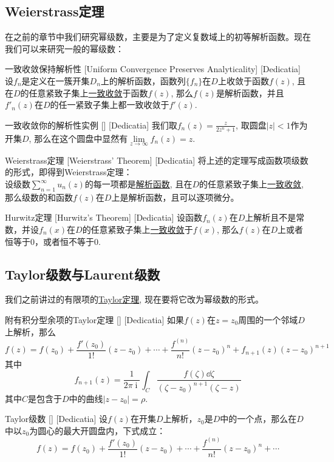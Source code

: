 \documentclass[UTF8]{ctexart}
\DeclareMathOperator{\ii}{\mathrm{i}}
\newcommand{\AnalyticalFunction}{\hyperref[dfn:AnalyticalFunction]{解析函数}}
\newcommand{\UniformConvergence}{\hyperref[dfn:UniformConvergence]{一致收敛}}
\newcommand{\TaylorThm}{\hyperref[thm:Taylor]{Taylor定理}}
\begin{document}
\subsection{Weierstrass定理}
在之前的章节中我们研究幂级数，主要是为了定义复数域上的初等解析函数。现在我们可以来研究一般的幂级数：
\begin{thm}
    [UUID]
    {一致收敛保持解析性}
    [Uniform Convergence Preserves Analyticality]
    [Dedicatia]
    设$f_n$是定义在一簇开集$D_n$上的解析函数，函数列$\{f_n\}$在$D$上收敛于函数$f(z)$, 且在$D$的任意紧致子集上\UniformConvergence 于函数$f(z)$, 那么$f(z)$是解析函数，并且$f'_n(z)$在$D$的任一紧致子集上都一致收敛于$f'(z)$.
\end{thm}
\begin{xmp}
    [UUID]
    {一致收敛你的解析性实例}
    []
    [Dedicatia]
    我们取$f_n(z)=\frac{z}{2z^n+1}$, 取圆盘$|z|<1$作为开集$D$, 那么在这个圆盘中显然有$\lim\limits_{z\to\infty}f_n(z)=z$.
\end{xmp}
\begin{thm}
    [UUID]
    {Weierstrass定理}
    [Weierstrass' Theorem]
    [Dedicatia]
    将上述的定理写成函数项级数的形式，即得到Weierstrass定理：\\
    设级数$\sum_{n = 1}^{\infty} u_n(z)$的每一项都是\AnalyticalFunction , 且在$D$的任意紧致子集上\UniformConvergence , 那么级数的和函数$f(z)$在$D$上是解析函数，且可以逐项微分。
\end{thm}
\begin{thm}
    [UUID]
    {Hurwitz定理}
    [Hurwitz's Theorem]
    [Dedicatia]
    设函数$f_n(z)$在$D$上解析且不是常数，并设$f_n(x)$在$D$的任意紧致子集上\UniformConvergence 于$f(x)$, 那么$f(z)$在$D$上或者恒等于0，或者恒不等于0.
\end{thm}
\subsection{Taylor级数与Laurent级数}
我们之前讲过的有限项的\TaylorThm , 现在要将它改为幂级数的形式。
\begin{thm}
    [UUID]
    {附有积分型余项的Taylor定理}
    []
    [Dedicatia]
    如果$f(z)$在$z=z_0$周围的一个邻域$D$上解析，那么
    \[f(z)=f(z_0)+\frac{f'(z_0)}{1!}(z-z_0)+\cdots+\frac{f^{(n)}}{n!}(z-z_0)^n+f_{n+1}(z)(z-z_0)^{n+1}\]
    其中
    \[f_{n+1}(z)=\frac{1}{2\pi\ii}\int_C\frac{f(\zeta)\dd{\zeta}}{(\zeta-z_0)^{n+1}(\zeta-z)}\]
    其中$C$是包含于$D$中的曲线$|z-z_0|=\rho$. 
\end{thm}
\begin{thm}
    [UUID]
    {Taylor级数}
    []
    [Dedicatia]
    设$f(z)$在开集$D$上解析，$z_0$是$D$中的一个点，那么在$D$中以$z_0$为圆心的最大开圆盘内，下式成立：
    \[f(z)=f(z_0)+\frac{f'(z_0)}{1!}(z-z_0)+\cdots+\frac{f^{(n)}}{n!}(z-z_0)^n+\cdots\]
\end{thm}
\end{document}
